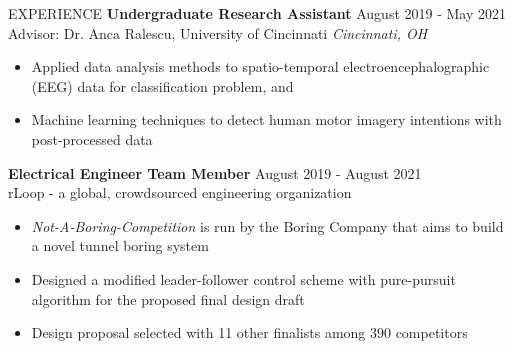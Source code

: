 \documentclass{lib/resume} %
\begin{document}
\begin{rSection}{EXPERIENCE}
    \textbf{Undergraduate Research Assistant} \hfill August 2019 - May 2021 \\
    Advisor: Dr. Anca Ralescu, University of Cincinnati \hfill \textit{Cincinnati, OH}
    \begin{itemize}
        \itemsep -4pt {}
        \item Applied data analysis methods to spatio-temporal electroencephalographic (EEG) data for classification problem, and
        \item Machine learning techniques to detect human motor imagery intentions with post-processed data
    \end{itemize}



    \textbf{Electrical Engineer Team Member} \hfill August 2019 - August 2021
    \\	rLoop - a global, crowdsourced engineering organization \hfill \textit{}
    \begin{itemize}
        \itemsep -4pt {}
        \item \textit{Not-A-Boring-Competition} is run by the Boring Company that aims to build a novel tunnel boring system
        \item Designed a modified leader-follower control scheme with pure-pursuit algorithm for the proposed final design draft
        \item Design proposal selected with 11 other finalists among 390 competitors
    \end{itemize}



\end{rSection}

\end{document}
